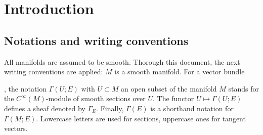\section{Introduction}
\subsection{Notations and writing conventions}
All manifolds are assumed to be smooth.
Thorough this document, the next writing conventions are applied:
$M$ is a smooth manifold. For a vector bundle  , the notation $\Gamma(U;E)$ with $U \subset M$ an open subset
of the manifold $M$ stands for the $C^\infty(M)$-module of smooth sections over
$U$. The functor $U \mapsto \Gamma(U;E)$ defines a sheaf denoted by $\Gamma_E$. Finally,
$\Gamma(E)$ is a shorthand notation for $\Gamma(M;E).$ Lowercase letters are used for sections,
uppercase ones for tangent vectors.
